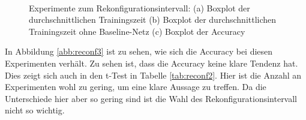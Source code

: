 \begin{figure}
     \centering
     \hfill
     \\
     \caption{Experimente zum Rekonfigurationsintervall: (a) Boxplot der durchschnittlichen Trainingszeit (b) Boxplot der durchschnittlichen Trainingszeit ohne Baseline-Netz (c) Boxplot der Accuracy}
     \label{abb:reconf}
\end{figure}

In Abbildung \ref{abb:reconf3} ist zu sehen, wie sich die Accuracy bei diesen Experimenten verhält. Zu sehen ist, dass die Accuracy keine klare Tendenz hat. Dies zeigt sich auch in den t-Test in Tabelle \ref{tab:reconf2}. Hier ist die Anzahl an Experimenten wohl zu gering, um eine klare Aussage zu treffen. Da die Unterschiede hier aber so gering sind ist die Wahl des Rekonfigurationsintervall nicht so wichtig.



